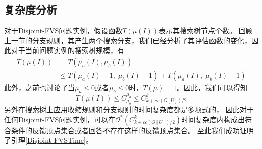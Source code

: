 \subsection{复杂度分析}
对于Disjoint-FVS问题实例，假设函数$T(\mu(I))$表示其搜索树节点个数。
回顾上一节的分支规则，其产生两个搜索分支，我们已经分析了其评估函数的变化，因此对于当前问题实例的搜索树规模，有
\begin{equation*} \begin{aligned}
  T(\mu(I)) & = T(\mu_a(I), \mu_b(I)) \\
            & \le T(\mu_a(I) - 1,\; \mu_b(I) - 1) +  T(\mu_a(I),\; \mu_b(I) - 1)
\end{aligned} \end{equation*}
此外，之前也讨论了当$\mu_a \le 0$或者$\mu_b \le 0$时，$T(\mu) = 1$。因此，我们可以得知
\[T(\mu(I)) \le C^{\mu_a}_{\mu_b} \le C^k_{k + cc(G[U])/2}\]
另外在搜索树上应用收缩规则和分支规则的时间复杂度都是多项式的，
因此对于任何Disjoint-FVS问题实例，可以在$\mathcal{O}^*(C^k_{k + cc(G[U])/2})$时间复杂度内构成出符合条件的反馈顶点集合或者回答不存在这样的反馈顶点集合。
至此我们成功证明了引理\ref{Disjoint-FVSTime}。

